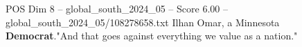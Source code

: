 \begin{textsample}{POS Dim 8 – global\_south\_2024\_05 – Score 6.00 – global\_south\_2024\_05/108278658.txt}
Ilhan Omar, a Minnesota \textbf{Democrat}."And that goes against everything we value as a nation."

\end{textsample}
